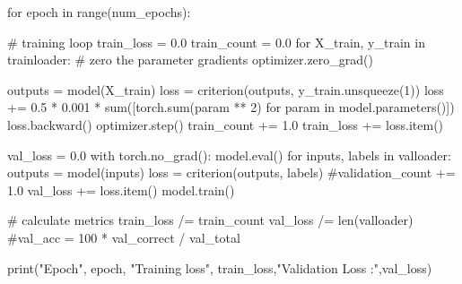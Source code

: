 \documentclass[11pt]{article}
\begin{document}
\begin{python}
  for epoch in range(num_epochs):

    # training loop
    train_loss = 0.0
    train_count = 0.0
    for X_train, y_train in trainloader:
        # zero the parameter gradients
        optimizer.zero_grad()

        outputs = model(X_train)
        loss = criterion(outputs, y_train.unsqueeze(1))
        loss += 0.5 * 0.001 * sum([torch.sum(param ** 2) for param in model.parameters()])
        loss.backward()
        optimizer.step()
        train_count += 1.0
        train_loss += loss.item()

    val_loss = 0.0
    with torch.no_grad():
        model.eval()
        for inputs, labels in valloader:
            outputs = model(inputs)
            loss = criterion(outputs, labels)
            #validation_count += 1.0
            val_loss += loss.item()
    model.train()

    # calculate metrics
    train_loss /= train_count
    val_loss /= len(valloader)
    #val_acc = 100 * val_correct / val_total

    print("Epoch", epoch, "Training loss", train_loss,"Validation Loss :",val_loss)
\end{python}

\end{document}
